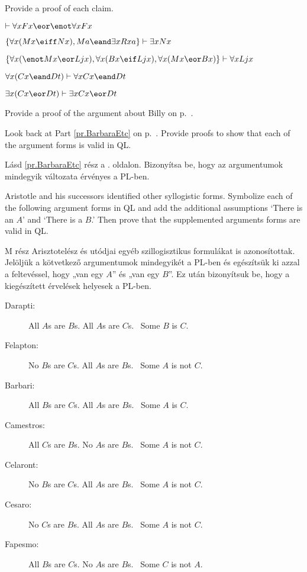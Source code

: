 \solutions
\problempart
\label{pr.someQLproofs}
Provide a proof of each claim.
\begin{earg}
\item $\vdash \forall x Fx \eor \enot \forall x Fx$
\item $\{\forall x(Mx \eiff Nx), Ma\eand\exists x Rxa\}\vdash \exists x Nx$
\item $\{\forall x(\enot Mx \eor Ljx), \forall x(Bx\eif Ljx), \forall x(Mx\eor Bx)\}\vdash \forall xLjx$
\item $\forall x(Cx \eand Dt)\vdash \forall xCx \eand Dt$
\item $\exists x(Cx \eor Dt)\vdash \exists x Cx \eor Dt$
\end{earg}

\problempart
Provide a proof of the argument about Billy on p.~\pageref{surgeon2}.




\problempart
\label{pr.BarbaraEtc.proof1}
Look back at Part \ref{pr.BarbaraEtc} on p.~\pageref{pr.BarbaraEtc}. Provide proofs to show that each of the argument forms is valid in QL.

Lásd \ref{pr.BarbaraEtc} rész a \pageref{pr.BarbaraEtc}. oldalon. Bizonyítsa be, hogy az argumentumok mindegyik változata érvényes a PL-ben.


\problempart
\label{pr.BarbaraEtc.proof2}
Aristotle and his successors identified other syllogistic forms. Symbolize each of the following argument forms in QL and add the additional assumptions `There is an $A$' and `There is a $B$.' Then prove that the supplemented arguments forms are valid in QL.

M rész Arisztotelész és utódjai egyéb szillogisztikus formulákat is azonosítottak. Jelöljük a kötvetkező argumentumok mindegyikét a PL-ben és egészítsük ki azzal a feltevéssel, hogy „van egy $A$” és „van egy $B$”. Ez után bizonyítsuk be, hogy a kiegészített érvelések helyesek a PL-ben.


\begin{description}
\item[Darapti:] All $A$s are $B$s. All $A$s are $C$s.
	\therefore\  Some $B$ is $C$.
\item[Felapton:] No $B$s are $C$s. All $A$s are $B$s.
	\therefore\  Some $A$ is not $C$.
\item[Barbari:] All $B$s are $C$s. All $A$s are $B$s.
	\therefore\  Some $A$ is $C$.
\item[Camestros:] All $C$s are $B$s. No $A$s are $B$s.
	\therefore\  Some $A$ is not $C$.
\item[Celaront:] No $B$s are $C$s. All $A$s are $B$s.
	\therefore\  Some $A$ is not $C$.
\item[Cesaro:] No $C$s are $B$s. All $A$s are $B$s.
	\therefore\  Some $A$ is not $C$.
\item[Fapesmo:] All $B$s are $C$s. No $A$s are $B$s.
	\therefore\  Some $C$ is not $A$.
\end{description}

